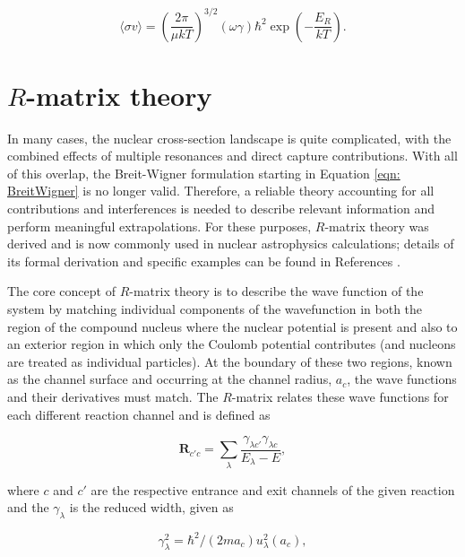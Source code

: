 \begin{equation}
\langle \sigma v \rangle = \left(  \dfrac{2 \pi}{\mu k T} \right)^{3/2} (\omega \gamma) \hbar^{2} \exp \left( - \dfrac{E_{R}}{k T} \right).
\end{equation}



\section{$R$-matrix theory}
\label{sec: r-matrix}

In many cases, the nuclear cross-section landscape is quite complicated, with the combined effects of multiple resonances and direct capture contributions. With all of this overlap, the Breit-Wigner formulation starting in Equation \ref{eqn: BreitWigner} is no longer valid. Therefore, a reliable theory accounting for all contributions and interferences is needed to describe relevant information and perform meaningful extrapolations. For these purposes, $R$-matrix theory was derived and is now commonly used in nuclear astrophysics calculations; details of its formal derivation and specific examples can be found in References \cite{Lane1958, Azuma2010}. 

The core concept of $R$-matrix theory is to describe the wave function of the system by matching individual components of the wavefunction in both the region of the compound nucleus where the nuclear potential is present and also to an exterior region in which only the Coulomb potential contributes (and nucleons are treated as individual particles). At the boundary of these two regions, known as the channel surface and occurring at the channel radius, $a_{c}$, the wave functions and their derivatives must match. The $R$-matrix relates these wave functions for each different reaction channel and is defined as

\begin{equation}
\mathbf{R}_{c' c} =  \sum_\lambda \frac{\gamma_{\lambda c'}\gamma_{\lambda c}}{E_\lambda-E},
\label{eqn: Rmatrix}
\end{equation}

\noindent where $c$ and $c'$ are the respective entrance and exit channels of the given reaction and the $\gamma_{\lambda}$ is the reduced width, given as

\begin{equation}
\gamma_\lambda^2 = \hbar^2/(2m a_c)u_\lambda^2(a_c),
\end{equation}

